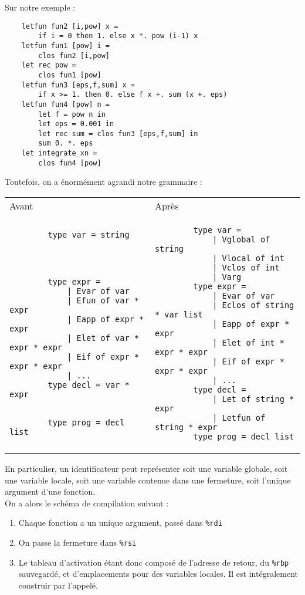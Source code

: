 \documentclass{cours}
\begin{document}
Sur notre exemple :
\begin{verbatim}
    letfun fun2 [i,pow] x =
        if i = 0 then 1. else x *. pow (i-1) x
    letfun fun1 [pow] i =
        clos fun2 [i,pow]
    let rec pow =
        clos fun1 [pow]
    letfun fun3 [eps,f,sum] x =
        if x >= 1. then 0. else f x +. sum (x +. eps)
    letfun fun4 [pow] n =
        let f = pow n in
        let eps = 0.001 in
        let rec sum = clos fun3 [eps,f,sum] in
        sum 0. *. eps
    let integrate_xn =
        clos fun4 [pow]
\end{verbatim}

Toutefois, on a énormément agrandi notre grammaire : \\
\begin{tabular}{p{}p{}}
    Avant & Après \\
    \begin{verbatim}
        type var = string




        type expr =
            | Evar of var
            | Efun of var * expr
            | Eapp of expr * expr
            | Elet of var * expr * expr
            | Eif of expr * expr * expr
            | ...
        type decl = var * expr


        type prog = decl list
    \end{verbatim}
          &
    \begin{verbatim}
        type var =
            | Vglobal of string
            | Vlocal of int
            | Vclos of int
            | Varg
        type expr =
            | Evar of var
            | Eclos of string * var list
            | Eapp of expr * expr
            | Elet of int * expr * expr
            | Eif of expr * expr * expr
            | ...
        type decl =
            | Let of string * expr
            | Letfun of string * expr
        type prog = decl list
    \end{verbatim}
\end{tabular}

En particulier, un identificateur peut représenter soit une variable globale, soit une variable locale, soit une variable contenue dans une fermeture, soit l'unique argument d'une fonction.\\
On a alors le schéma de compilation suivant :
\begin{enumerate}
    \item Chaque fonction a un unique argument, passé dans \texttt{\%rdi}
    \item On passe la fermeture dans \texttt{\%rsi}
    \item Le tableau d'activation étant donc composé de l'adresse de retour, du \texttt{\%rbp} sauvegardé, et d'emplacements pour des variables locales. Il est intégralement construir par l'appelé.
\end{enumerate}
\end{document}
